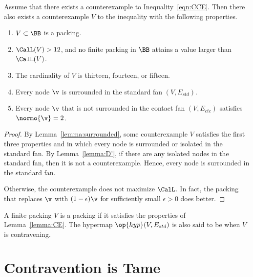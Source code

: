 \begin{lemma}[]\label{lemma:CE} 
  Assume that there exists a counterexample to
  Inequality~\ref{eqn:CCE}.  Then there also exists a counterexample
  $V$ to the inequality with the following properties.
\begin{enumerate}\wasitemize 
\item $V\subset \BB$ is a packing.
\item $\CalL(V) > 12$, and no finite packing in $\BB$ attains a value
  larger than $\CalL(V)$.
\item The cardinality of $V$ is thirteen, fourteen, or fifteen.
\item Every node $\v$ is surrounded in the standard fan $(V,E_{std})$.
\item Every node $\v$ that is not surrounded in the contact fan $(V,E_{ctc})$ satisfies $\normo{\v}=2$.
\end{enumerate}\wasitemize 
\end{lemma}
%

\begin{proof} By Lemma~\ref{lemma:surrounded}, some counterexample $V$
  satisfies the first three properties and in which every node is
  surrounded or isolated in the standard fan.  By
  Lemma~\ref{lemma:D'}, if there are any isolated nodes in the
  standard fan, then it is not a counterexample.  Hence, every node
  is surrounded in the standard fan.

    Otherwise, the counterexample does not
  maximize $\CalL$.  In fact, the packing that replaces $\v$ with
  $(1-\epsilon)\v$ for sufficiently small $\epsilon>0$ does better.
\end{proof}


\begin{definition}[contravening]\label{def:contravening}
  A finite packing  $V$ is a  packing if it
  satisfies the properties of Lemma~\ref{lemma:CE}.  The
 hypermap $\op{hyp}(V,E_{std})$ is also said to be
   when $V$ is contravening.
\end{definition}






\section{Contravention is Tame}
%
\label{sec:contraproof}

